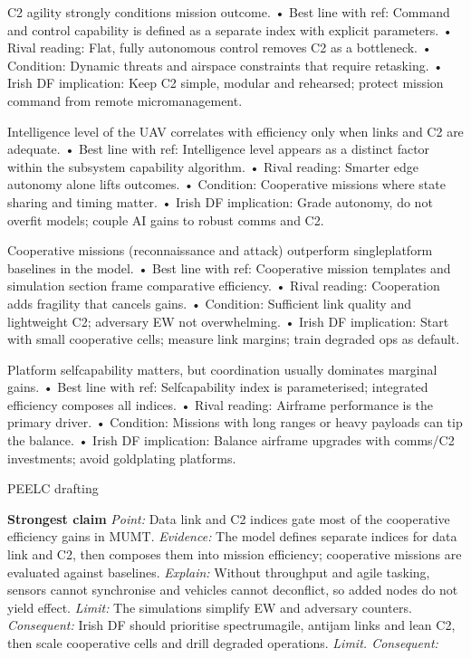 C2 agility strongly conditions mission outcome.
• Best line with ref: Command and control capability is defined as a separate index with explicit parameters.
• Rival reading: Flat, fully autonomous control removes C2 as a bottleneck.
• Condition: Dynamic threats and airspace constraints that require re\textendash tasking.
• Irish DF implication: Keep C2 simple, modular and rehearsed; protect mission command from remote micromanagement.

Intelligence level of the UAV correlates with efficiency only when links and C2 are adequate.
• Best line with ref: Intelligence level appears as a distinct factor within the subsystem capability algorithm.
• Rival reading: Smarter edge autonomy alone lifts outcomes.
• Condition: Cooperative missions where state sharing and timing matter.
• Irish DF implication: Grade autonomy, do not overfit models; couple AI gains to robust comms and C2.

Cooperative missions (reconnaissance and attack) outperform single\textendash platform baselines in the model.
• Best line with ref: Cooperative mission templates and simulation section frame comparative efficiency.
• Rival reading: Cooperation adds fragility that cancels gains.
• Condition: Sufficient link quality and lightweight C2; adversary EW not overwhelming.
• Irish DF implication: Start with small cooperative cells; measure link margins; train degraded ops as default.

Platform self\textendash capability matters, but coordination usually dominates marginal gains.
• Best line with ref: Self\textendash capability index is parameterised; integrated efficiency composes all indices.
• Rival reading: Airframe performance is the primary driver.
• Condition: Missions with long ranges or heavy payloads can tip the balance.
• Irish DF implication: Balance airframe upgrades with comms/C2 investments; avoid gold\textendash plating platforms.

PEEL\textendash C drafting

\textbf{Strongest claim}
\textit{Point:} Data link and C2 indices gate most of the cooperative efficiency gains in MUM\textendash T.
\textit{Evidence:} The model defines separate indices for data link and C2, then composes them into mission efficiency; cooperative missions are evaluated against baselines.
\textit{Explain:} Without throughput and agile tasking, sensors cannot synchronise and vehicles cannot deconflict, so added nodes do not yield effect.
\textit{Limit:} The simulations simplify EW and adversary counters.
\textit{Consequent:} Irish DF should prioritise spectrum\textendash agile, anti\textendash jam links and lean C2, then scale cooperative cells and drill degraded operations. \textit{Limit. Consequent:}

